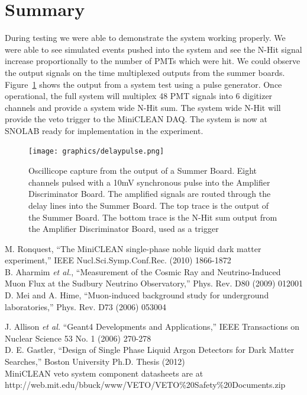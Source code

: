 \documentclass{JINST}
\begin{document}
\section{Summary}
\label{Summary}
%
During testing we were able to demonstrate the system working
properly.  We were able to see simulated events pushed into the system
and see the N-Hit signal increase proportionally to the number of PMTs
which were hit.  We could observe the output signals on the time
multiplexed outputs from the summer boards.  Figure~\ref{fig:multipulse} shows the output from a system test using a pulse generator.
Once operational, the
full system will multiplex 48 PMT signals into 6 digitizer channels
and provide a system wide N-Hit sum.  The system wide N-Hit will
provide the veto trigger to the MiniCLEAN DAQ.  The system is now at
SNOLAB ready for implementation in the experiment.

\begin{figure}[ht]
	\begin{center}
		\texttt{[image: graphics/delaypulse.png]}
		\caption{Oscillicope capture from the output of a Summer Board.  Eight channels
			pulsed with a 10mV synchronous pulse into the Amplifier Discriminator Board.  The amplified
			signals are routed through the delay lines into the Summer Board.  The top trace is
			the output of the Summer Board.  The bottom trace is the N-Hit sum output from the
		Amplifier Discriminator Board, used as a trigger
	\label{fig:multipulse}}
	\end{center}
\end{figure}

\begin{thebibliography}{999}

M. Ronquest, ``The MiniCLEAN single-phase noble liquid dark matter experiment,'' IEEE Nucl.Sci.Symp.Conf.Rec. (2010) 1866-1872 \\

B. Aharmim {\it et al.}, ``Measurement of the Cosmic Ray and Neutrino-Induced Muon Flux at the Sudbury Neutrino Observatory,'' Phys. Rev. D80 (2009) 012001 \\

D. Mei and A. Hime, ``Muon-induced background study for underground laboratories,'' Phys. Rev. D73 (2006) 053004

J. Allison {\it et al.} ``Geant4 Developments and Applications,'' IEEE Transactions on Nuclear Science 53 No. 1 (2006) 270-278 \\

D. E. Gastler, ``Design of Single Phase Liquid Argon Detectors for Dark Matter Searches,'' Boston University Ph.D. Thesis (2012) \\

 MiniCLEAN veto system component datasheets are at http://web.mit.edu/bbuck/www/VETO/VETO\%20Safety\%20Documents.zip \\

\end{thebibliography}
\end{document}
